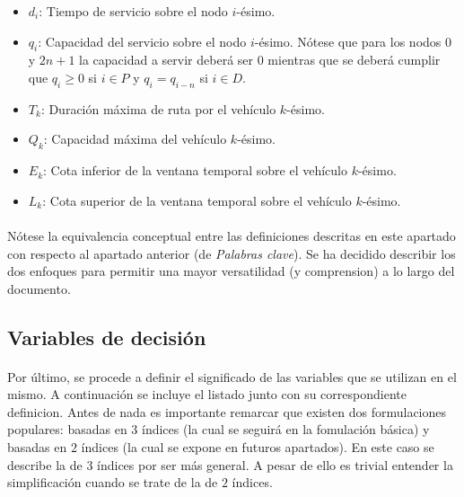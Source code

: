 \documentclass{subfiles}
\begin{document}
\begin{itemize}
          \item $d_{i}$: Tiempo de servicio sobre el nodo $i$-ésimo.

          \item $q_{i}$: Capacidad del servicio sobre el nodo $i$-ésimo. Nótese que para los nodos $0$ y $2n + 1$ la capacidad a servir deberá ser $0$ mientras que se deberá cumplir que $q_{i} \geq 0$ si $i \in P$ y $q_{i} = q_{i - n}$ si $i \in D$.

          \item $T_{k}$: Duración máxima de ruta por el vehículo $k$-ésimo.

          \item $Q_{k}$: Capacidad máxima del vehículo $k$-ésimo.

          \item $E_{k}$: Cota inferior de la ventana temporal sobre el vehículo $k$-ésimo.

          \item $L_{k}$: Cota superior de la ventana temporal sobre el vehículo $k$-ésimo.

        \end{itemize}

        \paragraph{}
        Nótese la equivalencia conceptual entre las definiciones descritas en este apartado con respecto al apartado anterior (de \emph{Palabras clave}). Se ha decidido describir los dos enfoques para permitir una mayor versatilidad (y comprension) a lo largo del documento.

      \subsection{Variables de decisión}
      \label{sec:formulation_variables}

        \paragraph{}
        Por último, se procede a definir el significado de las variables que se utilizan en el mismo. A continuación se incluye el listado junto con su correspondiente definicion. Antes de nada es importante remarcar que existen dos formulaciones populares: basadas en $3$ índices (la cual se seguirá en la fomulación básica) y basadas en $2$ índices (la cual se expone en futuros apartados). En este caso se describe la de 3 índices por ser más general. A pesar de ello es trivial entender la simplificación cuando se trate de la de $2$ índices.
\end{document}
